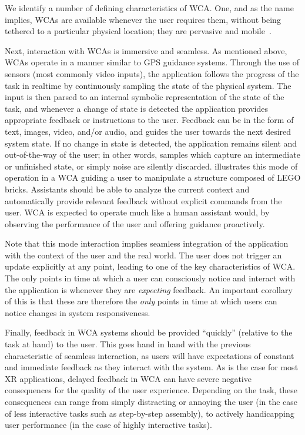 We identify a number of defining characteristics of \gls{WCA}.
One, and as the name implies, \glspl{WCA} are available whenever the user requires them, without being tethered to a particular physical location;
they are pervasive and mobile~\cite{ha2014towards}.

Next, interaction with \glspl{WCA} is immersive and seamless.
As mentioned above, \glspl{WCA} operate in a manner similar to \gls{GPS} guidance systems.
Through the use of sensors (most commonly video inputs), the application follows the progress of the task in realtime by continuously sampling the state of the physical system.
The input is then parsed to an internal symbolic representation of the state of the task, and whenever a change of state is detected the application provides appropriate feedback or instructions to the user.
Feedback can be in the form of text, images, video, and/or audio, and guides the user towards the next desired system state.
If no change in state is detected, the application remains silent and out-of-the-way of the user;
in other words, samples which capture an intermediate or unfinished state, or simply noise are silently discarded.
 illustrates this mode of operation in a \gls{WCA} guiding a user to manipulate a structure composed of LEGO bricks.
Assistants should be able to analyze the current context and automatically provide relevant feedback without explicit commands from the user.
\gls{WCA} is expected to operate much like a human assistant would, by observing the performance of the user and offering guidance proactively.

Note that this mode interaction implies seamless integration of the application with the context of the user and the real world.
The user does not trigger an update explicitly at any point, leading to one of the key characteristics of \gls{WCA}.
The only points in time at which a user can consciously notice and interact with the application is whenever they are \emph{expecting} feedback.
An important corollary of this is that these are therefore the \emph{only} points in time at which users can notice changes in system responsiveness.

Finally, feedback in \gls{WCA} systems should be provided ``quickly'' (relative to the task at hand) to the user.
This goes hand in hand with the previous characteristic of seamless interaction, as users will have expectations of constant and immediate feedback as they interact with the system.
As is the case for most \gls{XR} applications, delayed feedback in \gls{WCA} can have severe negative consequences for the quality of the user experience.
Depending on the task, these consequences can range from simply distracting or annoying the user (in the case of less interactive tasks such as step-by-step assembly), to actively handicapping user performance (in the case of highly interactive tasks).


